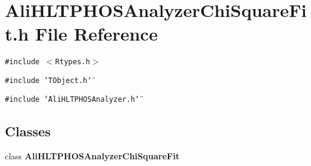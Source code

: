 \section{Ali\-HLTPHOSAnalyzer\-Chi\-Square\-Fit.h File Reference}
\label{AliHLTPHOSAnalyzerChiSquareFit_8h}
{\tt \#include $<$Rtypes.h$>$}\par
{\tt \#include \char`\"{}TObject.h\char`\"{}}\par
{\tt \#include \char`\"{}Ali\-HLTPHOSAnalyzer.h\char`\"{}}\par
\subsection*{Classes}
\begin{CompactItemize}
\item 
class {\bf Ali\-HLTPHOSAnalyzer\-Chi\-Square\-Fit}
\end{CompactItemize}
